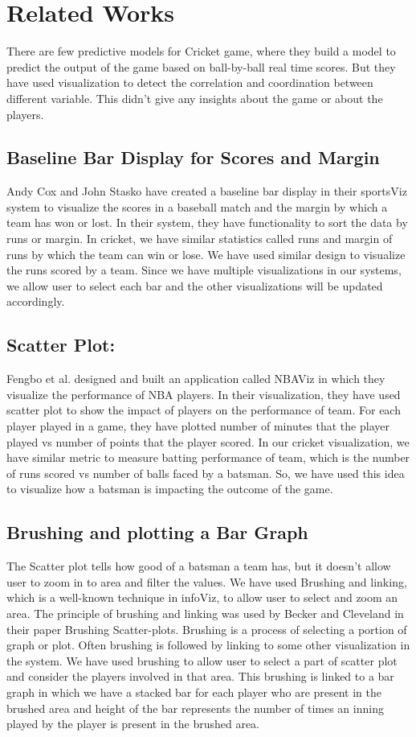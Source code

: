 \documentclass[10pt,journal,compsoc]{IEEEtran}
\begin{document}
\section {Related Works}
There are few predictive models for Cricket game\cite{cricket}, where they build a model to predict the output of the game based on ball-by-ball real time scores. But they have used visualization to detect the correlation and coordination between different variable. This didn't give any insights about the game or about the players.

\subsection{Baseline Bar Display for Scores and Margin}
Andy Cox and John Stasko have created a baseline bar display in their sportsViz\cite{sportsvis} system to visualize the scores in a baseball match and the margin by which a team has won or lost. In their system, they have functionality to sort the data by runs or margin. In cricket, we have similar statistics called runs and margin of runs by which the team can win or lose. We have used similar design to visualize the runs scored by a team. Since we have multiple visualizations in our systems, we allow user to select each bar and the other visualizations will be updated accordingly.

\subsection{Scatter Plot:}
Fengbo et al. designed and built an application called NBAViz\cite{nbavis} in which they visualize the performance of NBA players. In their visualization, they have used scatter plot to show the impact of players on the performance of team. For each player played in a game, they have plotted number of minutes that the player played vs number of points that the player scored. In our cricket visualization, we have similar metric to measure batting performance of team, which is the number of runs scored vs number of balls faced by a batsman. So, we have used this idea to visualize how a batsman is impacting the outcome of the game.

\subsection{Brushing and plotting a Bar Graph}
The Scatter plot tells how good of a batsman a team has, but it doesn't allow user to zoom in to area and filter the values. We have used Brushing and linking, which is a well-known technique in infoViz, to allow user to select and zoom an area. The principle of brushing and linking was used by Becker and Cleveland in their paper Brushing Scatter-plots\cite{scatterplots1}. Brushing is a process of selecting a portion of graph or plot. Often brushing is followed by linking to some other visualization in the system. We have used brushing to allow user to select a part of scatter plot and consider the players involved in that area. This brushing is linked to a bar graph in which we have a stacked bar for each player who are present in the brushed area and height of the bar represents the number of times an inning played by the player is present in the brushed area.
\end{document}
